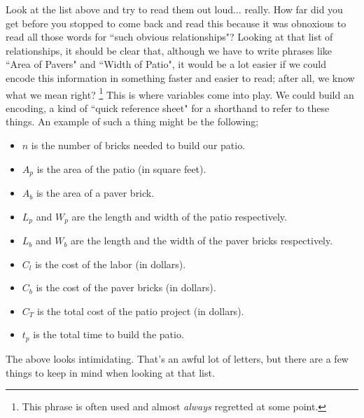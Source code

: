 \documentclass{ximeraXloud}
\begin{document}
Look at the list above and try to read them out loud... really. How far did you get before you stopped to come back and read this because it was obnoxious to read all those words for ``such obvious relationships"? Looking at that list of relationships, it should be clear that, although we have to write phrases like ``Area of Pavers" and ``Width of Patio", it would be a lot easier if we could encode this information in something faster and easier to read; after all, we know what we mean right?%
\footnote{This phrase is often used and almost \textit{always} regretted at some point.}
This is where variables come into play. We could build an encoding, a kind of ``quick reference sheet" for a shorthand to refer to these things. An example of such a thing might be the following;
\begin{itemize}
    \item $n$ is the number of bricks needed to build our patio.
    \item $A_p$ is the area of the patio (in square feet).
    \item $A_b$ is the area of a paver brick.
    \item $L_p$ and $W_p$ are the length and width of the patio respectively.
    \item $L_b$ and $W_b$ are the length and the width of the paver bricks respectively.
    \item $C_l$ is the cost of the labor (in dollars).
    \item $C_b$ is the cost of the paver bricks (in dollars).
    \item $C_T$ is the total cost of the patio project (in dollars).
    \item $t_p$ is the total time to build the patio.
\end{itemize}

The above looks intimidating. That's an awful lot of letters, but there are a few things to keep in mind when looking at that list. 
\end{document}

